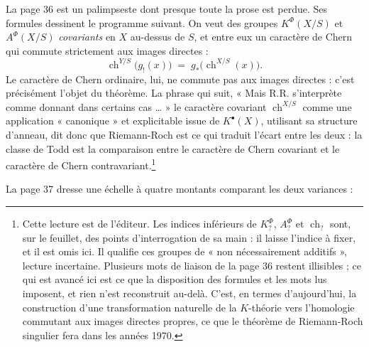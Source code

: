 \documentclass[11pt,a4paper]{article}
\begin{document}
La page 36 est un palimpseste dont presque toute la prose est perdue. Ses
formules dessinent le programme suivant. On veut des groupes
$K^{\Phi}(X/S)$ et $A^{\Phi}(X/S)$ \emph{covariants} en $X$ au-dessus de $S$,
et entre eux un caractère de Chern qui commute strictement aux images
directes :
\[
  \operatorname{ch}^{Y/S}\bigl(g_{!}(x)\bigr)
  \;=\; g_{*}\bigl(\operatorname{ch}^{X/S}(x)\bigr) .
\]
Le caractère de Chern ordinaire, lui, ne commute pas aux images directes :
c'est précisément l'objet du théorème. La phrase qui suit, « Mais R.R. s'interprète comme donnant dans certains cas
\ldots{} » le caractère covariant $\operatorname{ch}^{X/S}$ comme une
application « canonique » et explicitable issue de $K^{\bullet}(X)$, utilisant
sa structure d'anneau, dit donc que Riemann-Roch est ce qui traduit l'écart
entre les deux : la classe de Todd est la comparaison entre le caractère de
Chern covariant et le caractère de Chern contravariant.\footnote{Cette lecture
est de l'éditeur. Les indices inférieurs de $K^{\Phi}_{?}$, $A^{\Phi}_{?}$ et
$\operatorname{ch}_{?}$ sont, sur le feuillet, des points d'interrogation de
sa main : il laisse l'indice à fixer, et il est omis ici. Il qualifie ces
groupes de « non nécessairement additifs », lecture incertaine. Plusieurs
mots de liaison de la page 36 restent illisibles ; ce qui est avancé ici est
ce que la disposition des formules et les mots lus imposent, et rien n'est
reconstruit au-delà. C'est, en termes
d'aujourd'hui, la construction d'une transformation naturelle de la $K$-théorie
vers l'homologie commutant aux images directes propres, ce que le théorème
de Riemann-Roch singulier fera dans les années 1970.}

La page 37 dresse une échelle à quatre montants comparant les deux variances :

\end{document}
